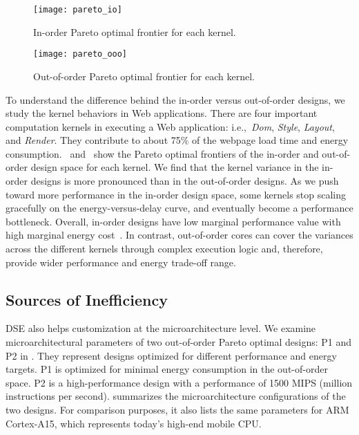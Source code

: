 
\begin{figure}[t]
  \centering
  \texttt{[image: pareto\_io]}
  \caption{In-order Pareto optimal frontier for each kernel.}
  \label{fig:pareto_io}
\end{figure}

\begin{figure}[t]
  \centering
  \texttt{[image: pareto\_ooo]}
  \caption{Out-of-order Pareto optimal frontier for each kernel.}
  \label{fig:pareto_ooo}
\end{figure}

To understand the difference behind the in-order versus out-of-order designs, we study the kernel behaviors in Web applications. There are four important computation kernels in executing a Web application: i.e.,~\textit{Dom}, \textit{Style}, \textit{Layout}, and \textit{Render}. They contribute to about 75\% of the webpage load time and energy consumption.~ and~ show the Pareto optimal frontiers of the in-order and out-of-order design space for each kernel. We find that the kernel variance in the in-order designs is more pronounced than in the out-of-order designs. As we push toward more performance in the in-order design space, some kernels stop scaling gracefully on the energy-versus-delay curve, and eventually become a performance bottleneck. Overall, in-order designs have low marginal performance value with high marginal energy cost~\cite{marginal}. In contrast, out-of-order cores can cover the variances across the different kernels through complex execution logic and, therefore, provide wider performance and energy trade-off range.

\subsection{Sources of Inefficiency}
\label{sec:arch:customization:sources}

DSE also helps customization at the microarchitecture level. We examine microarchitectural parameters of two out-of-order Pareto optimal designs: P1 and P2 in . They represent designs optimized for different performance and energy targets. P1 is optimized for minimal energy consumption in the out-of-order space. P2 is a high-performance design with a performance of 1500 MIPS (million instructions per second).  summarizes the microarchitecture configurations of the two designs. For comparison purposes, it also lists the same parameters for ARM Cortex-A15, which represents today's high-end mobile CPU.

